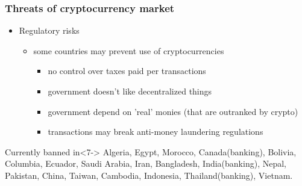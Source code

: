 \documentclass{beamer}
\begin{document}
\begin{frame}
\frametitle{Threats of cryptocurrency market}
\begin{itemize}
    \item<1-> Regulatory risks
    \begin{itemize}
        \item<2-> some countries may prevent use of cryptocurrencies
        \begin{itemize}
            \item<3-> no control over taxes paid per transactions
            \item<4-> government doesn't like decentralized things
            \item<5-> government depend on 'real' monies (that are outranked by crypto)
            \item<6-> transactions may break anti-money laundering regulations
        \end{itemize}
    \end{itemize}
\end{itemize}
\vspace{20pt}
\begin{exampleblock}{Currently banned in}<7->
    Algeria, Egypt, Morocco, Canada(banking), Bolivia, Columbia, Ecuador, Saudi Arabia, Iran, Bangladesh,
    India(banking), Nepal, Pakistan, China, Taiwan, Cambodia, Indonesia, Thailand(banking), Vietnam.
\end{exampleblock}
\end{frame}
\end{document}
